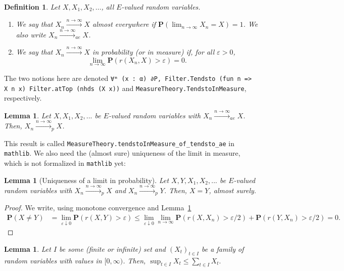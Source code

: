 \documentclass{article}
\newtheorem{lemma}[proposition]{Lemma}
\newtheorem{definition}[proposition]{Definition}
\theoremstyle{definition}
\theoremstyle{step} \newtheorem{step}{Step}
\newcommand{\leanline}[1]{\texttt{#1}}%
\begin{document}
\begin{definition}
  Let $X,X_1,X_2,...$, all $E$-valued random variables.
  \begin{enumerate}
    \item We say that $X_n \xrightarrow{n\to\infty} X$ almost everywhere
          if $\mathbf P(\lim_{n\to\infty} X_n = X) = 1$. We also write
          $X_n\xrightarrow{n\to\infty}_{ae} X$.
    \item We say that $X_n \xrightarrow{n\to\infty} X$ in probability
          (or in measure) if, for all $\varepsilon>0$,
          $$ \lim_{n\to\infty} \mathbf P(r(X_n, X) > \varepsilon) = 0.$$
  \end{enumerate}
\end{definition}
The two notions here are denoted \leanline{∀ᵐ (x : α) ∂P,
  Filter.Tendsto (fun n => X n x) Filter.atTop (nhds (X x))} and
\leanline{MeasureTheory.TendstoInMeasure}, respectively.

\begin{lemma}\label{l:aep}
  Let $X,X_1,X_2,...$ be $E$-valued random variables with $X_n
    \xrightarrow{n\to\infty}_{ae} X$. Then, $X_n
    \xrightarrow{n\to\infty}_{p} X$.
\end{lemma}

This result is called
\leanline{MeasureTheory.tendstoInMeasure_of_tendsto_ae} in
\leanline{mathlib}. We also need the (almost sure) uniqueness of the
limit in measure, which is not formalized in \leanline{mathlib} yet:

\begin{lemma}[Uniqueness of a limit in probability]\label{l:puni}
  Let $X,Y,X_1,X_2,...$ be $E$-valued random variables with $X_n
    \xrightarrow{n\to\infty}_{p} X$ and $X_n
    \xrightarrow{n\to\infty}_{p} Y$. Then, $X=Y$, almost surely.
\end{lemma}

\begin{proof}
  We write, using monotone convergence and Lemma~\ref{l:aep}
  \begin{align*}
    \mathbf P(X\neq Y) & = \lim_{\varepsilon \downarrow 0} \mathbf
    P(r(X,Y)>\varepsilon) \leq \lim_{\varepsilon \downarrow 0}
    \lim_{n\to\infty}\mathbf P(r(X,X_n)>\varepsilon/2) + \mathbf
    P(r(Y,X_n)>\varepsilon/2) = 0.
  \end{align*}
\end{proof}

\begin{lemma}\label{l:supsum}
  Let $I$ be some (finite or infinite) set and $(X_t)_{t\in I}$ be a
  family of random variables with values in $[0,\infty)$. Then,
  $\sup_{t\in I} X_t \leq \sum_{t\in I} X_t.$
\end{lemma}
\end{document}
